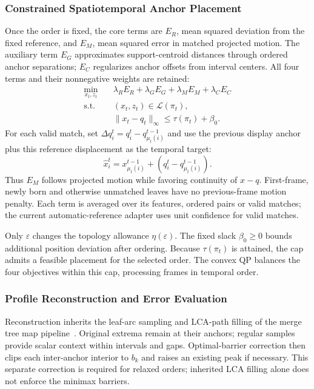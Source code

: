 \documentclass[review]{vgtc}
\begin{document}
\subsubsection{Constrained Spatiotemporal Anchor Placement}
Once the order is fixed, the core terms are $E_R$, mean squared deviation from the fixed reference, and $E_M$, mean squared error in matched projected motion. The auxiliary term $E_G$ approximates support-centroid distances through ordered anchor separations; $E_C$ regularizes anchor offsets from interval centers. All four terms and their nonnegative weights are retained:
\begin{equation}\label{eq:qp}
\begin{aligned}
 \min_{x_t,z_t}\quad&\lambda_R E_R+\lambda_G E_G+\lambda_M E_M+\lambda_C E_C\\
 \mathrm{s.t.}\quad&(x_t,z_t)\in\mathcal{L}(\pi_t),\\
 &\|x_t-q_t\|_\infty\le\tau(\pi_t)+\beta_0.
\end{aligned}
\end{equation}
For each valid match, set $\Delta q_i^t=q_i^t-q_{\mu_t(i)}^{t-1}$ and use the previous display anchor plus this reference displacement as the temporal target:
\begin{equation}\label{eq:temporal_target}
 \hat x_i^t=x_{\mu_t(i)}^{t-1}+(q_i^t-q_{\mu_t(i)}^{t-1}).
\end{equation}
Thus $E_M$ follows projected motion while favoring continuity of $x-q$. First-frame, newly born and otherwise unmatched leaves have no previous-frame motion penalty. Each term is averaged over its features, ordered pairs or valid matches; the current automatic-reference adapter uses unit confidence for valid matches. 

Only $\varepsilon$ changes the topology allowance $\eta(\varepsilon)$. The fixed slack $\beta_0\ge0$ bounds additional position deviation after ordering. Because $\tau(\pi_t)$ is attained, the cap admits a feasible placement for the selected order. The convex QP balances the four objectives within this cap, processing frames in temporal order.

\subsubsection{Profile Reconstruction and Error Evaluation}
Reconstruction inherits the leaf-arc sampling and LCA-path filling of the merge tree map pipeline~\cite{Koepp:2023:TMTM,STMTM:2026}. Original extrema remain at their anchors; regular samples provide scalar context within intervals and gaps. Optimal-barrier correction then clips each inter-anchor interior to $b_k$ and raises an existing peak if necessary. This separate correction is required for relaxed orders; inherited LCA filling alone does not enforce the minimax barriers.
\end{document}
